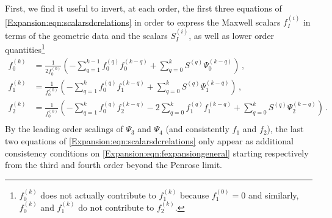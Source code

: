 First, we find it useful to invert, at each order, the first three equations of \eqref{Expansion:eqn:scalarsdcrelations} in order to express the Maxwell scalars $f^{(i)}_I$ in terms of the geometric data and the scalars  $S^{(i)}_I$, as well as lower order quantities\footnote{$f_0^{(k)}$ does not actually contribute to $f^{(k)}_1$ because $f^{(0)}_1 = 0$ and similarly, $f_0^{(k)}$ and $f_1^{(k)}$ do not contribute to $f_2^{(k)}$.}
\begin{equation}\label{Expansion:eqn:fexpansiongeneral}
\begin{aligned}
f^{(k)}_0 &= \frac{1}{2f_0^{(0)}}\left(-\sum^{k-1}_{q=1}f^{(q)}_0f^{(k-q)}_0  +\sum^k_{q=0} S^{(q)}\Psi_0^{(k-q)}\right) \, ,\\
f^{(k)}_1 &= \frac{1}{f_0^{(0)}}\left(-\sum^{k}_{q=1}f^{(q)}_0f^{(k-q)}_1 +\sum^k_{q=0} S^{(q)}\Psi_1^{(k-q)}\right) \, ,  \\ 
f^{(k)}_2 &= \frac{1}{f_0^{(0)}}\left(-\sum^{k}_{q=1}f^{(q)}_0f^{(k-q)}_2-2\sum^k_{q=0}f^{(q)}_1f^{(k-q)}_1+\sum^k_{q=0} S^{(q)}\Psi_2^{(k-q)}\right) \, . \\ 
\end{aligned}
\end{equation}
By the leading order scalings of $\Psi_3$ and $\Psi_4$ (and consistently $f_1$ and $f_2$), the last two equations of \eqref{Expansion:eqn:scalarsdcrelations} only appear as additional consistency conditions on \eqref{Expansion:eqn:fexpansiongeneral} starting respectively from the third and fourth order beyond the Penrose limit.

